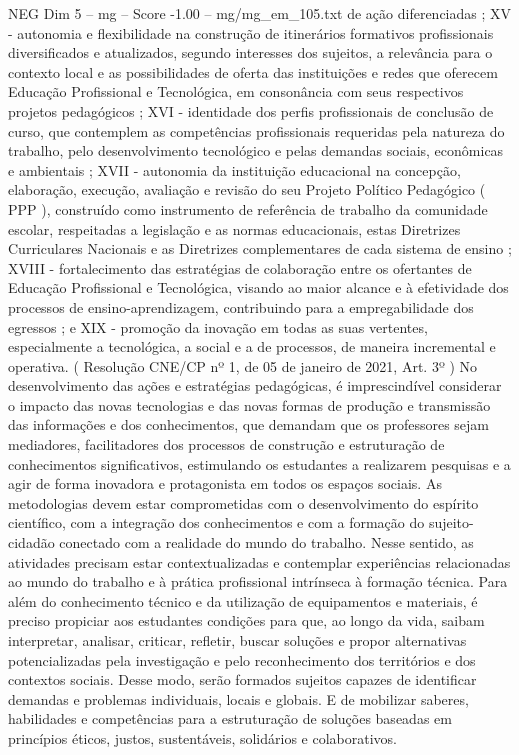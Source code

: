 \begin{textsample}{NEG Dim 5 – mg – Score -1.00 – mg/mg\_em\_105.txt}
de ação diferenciadas ; XV - autonomia e flexibilidade na construção de itinerários formativos profissionais diversificados e atualizados, segundo interesses dos sujeitos, a relevância para o contexto local e as possibilidades de oferta das instituições e redes que oferecem Educação Profissional e Tecnológica, em consonância com seus respectivos projetos pedagógicos ; XVI - identidade dos perfis profissionais de conclusão de curso, que contemplem as competências profissionais requeridas pela natureza do trabalho, pelo desenvolvimento tecnológico e pelas demandas sociais, econômicas e ambientais ; XVII - autonomia da instituição educacional na concepção, elaboração, execução, avaliação e revisão do seu Projeto Político Pedagógico ( PPP ), construído como instrumento de referência de trabalho da comunidade escolar, respeitadas a legislação e as normas educacionais, estas Diretrizes Curriculares Nacionais e as Diretrizes complementares de cada sistema de ensino ; XVIII - fortalecimento das estratégias de colaboração entre os ofertantes de Educação Profissional e Tecnológica, visando ao maior alcance e à efetividade dos processos de ensino-aprendizagem, contribuindo para a empregabilidade dos egressos ; e XIX - promoção da inovação em todas as suas vertentes, especialmente a tecnológica, a social e a de processos, de maneira incremental e operativa. ( Resolução CNE/CP nº 1, de 05 de janeiro de 2021, Art. 3º ) No desenvolvimento das ações e estratégias pedagógicas, é imprescindível considerar o impacto das novas tecnologias e das novas formas de produção e transmissão das informações e dos conhecimentos, que demandam que os professores sejam mediadores, facilitadores dos processos de construção e estruturação de conhecimentos significativos, estimulando os estudantes a realizarem pesquisas e a agir de forma inovadora e protagonista em todos os espaços sociais.
As metodologias devem estar comprometidas com o desenvolvimento do espírito científico, com a integração dos conhecimentos e com a formação do sujeito-cidadão conectado com a realidade do mundo do trabalho.
Nesse sentido, as atividades precisam estar contextualizadas e contemplar experiências relacionadas ao mundo do trabalho e à prática profissional intrínseca à formação técnica.
Para além do conhecimento técnico e da utilização de equipamentos e materiais, é preciso propiciar aos estudantes condições para que, ao longo da vida, saibam interpretar, analisar, criticar, refletir, buscar soluções e propor alternativas potencializadas pela investigação e pelo reconhecimento dos territórios e dos contextos sociais.
Desse modo, serão formados sujeitos capazes de identificar demandas e problemas individuais, locais e globais.
E de mobilizar saberes, habilidades e competências para a estruturação de soluções baseadas em princípios éticos, justos, sustentáveis, solidários e colaborativos.

\end{textsample}

